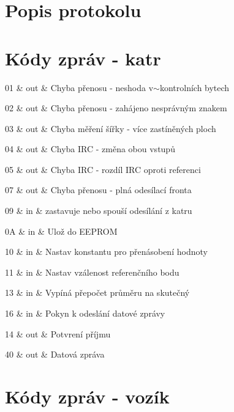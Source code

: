 \section{Popis protokolu}\label{comunication_protocol_cp_popis}
\section{Kódy zpráv -\/ katr}\label{comunication_protocol_cp_katr}

\begin{DoxyItemize}
\item 01 \& out \& Chyba přenosu -\/ neshoda v$\sim$kontrolních bytech
\item 02 \& out \& Chyba přenosu -\/ zahájeno nesprávným znakem
\item 03 \& out \& Chyba měření šířky -\/ více zastíněných ploch
\item 04 \& out \& Chyba IRC -\/ změna obou vstupů
\item 05 \& out \& Chyba IRC -\/ rozdíl IRC oproti referenci
\item 07 \& out \& Chyba přenosu -\/ plná odesílací fronta
\item 09 \& in \& zastavuje nebo spouší odesílání z katru
\item 0A \& in \& Ulož do EEPROM
\item 10 \& in \& Nastav konstantu pro přenásobení hodnoty
\item 11 \& in \& Nastav vzálenost referenčního bodu
\item 13 \& in \& Vypíná přepočet průměru na skutečný
\item 16 \& in \& Pokyn k odeslání datové zprávy
\item 14 \& out \& Potvrení příjmu
\item 40 \& out \& Datová zpráva
\end{DoxyItemize}\section{Kódy zpráv -\/ vozík}\label{comunication_protocol_cp_vozik}

